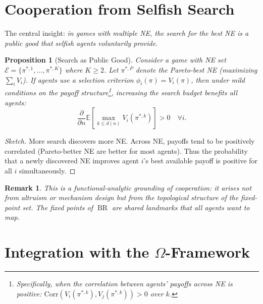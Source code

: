 \documentclass[11pt,a4paper]{article}
\newtheorem{proposition}[theorem]{Proposition}
\newtheorem{remark}[theorem]{Remark}
\DeclareMathOperator{\BR}{BR}
\newcommand{\E}{\mathbb{E}}
\begin{document}
\section{Cooperation from Selfish Search}
\label{sec:cooperation}

The central insight: \emph{in games with multiple NE, the search for the
best NE is a public good that selfish agents voluntarily provide.}

\begin{proposition}[Search as Public Good]\label{prop:public-good}
Consider a game with NE set $\mathcal{E} = \{\pi^{*,1}, \ldots, \pi^{*,K}\}$
where $K \geq 2$. Let $\pi^{*,P}$ denote the Pareto-best NE
(maximizing $\sum_i V_i$). If agents use a selection criterion
$\phi_i(\pi) = V_i(\pi)$, then under mild conditions on the payoff
structure\footnote{Specifically, when the correlation between agents'
payoffs across NE is positive: $\text{Corr}(V_i(\pi^{*,k}), V_j(\pi^{*,k})) > 0$ over $k$.},
increasing the search budget benefits \emph{all} agents:
\begin{equation}
    \frac{\partial}{\partial n} \E\left[\max_{k \leq d(n)} V_i(\pi^{*,k})\right] > 0
    \quad \forall i.
\end{equation}
\end{proposition}

\begin{proof}[Sketch]
More search discovers more NE. Across NE, payoffs tend to be positively
correlated (Pareto-better NE are better for most agents). Thus the
probability that a newly discovered NE improves agent $i$'s best
available payoff is positive for all $i$ simultaneously.
\end{proof}

\begin{remark}
This is a \emph{functional-analytic} grounding of cooperation: it
arises not from altruism or mechanism design but from the topological
structure of the fixed-point set. The fixed points of $\BR$ are
shared landmarks that all agents want to map.
\end{remark}


\section{Integration with the $\Omega$-Framework}
\label{sec:omega}
\end{document}
